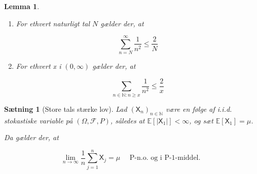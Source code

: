 \documentclass{article}
\newcommand{\1}{\mathbbm{1}}
\newtheorem{lemma}[theorem]{Lemma}
\newtheorem{proposition}[theorem]{Sætning}
\theoremstyle{boxed}
\begin{document}
\begin{theorem-box}
    \begin{lemma}
        \begin{enumerate}
            \item[\textnormal{(i)}] For ethvert naturligt tal $N$ gælder der, at

            $$
            \sum_{n=N}^{\infty} \frac{1}{n^2} \leq \frac{2}{N}
            $$
            
            \item[\textnormal{(ii)}] For ethvert x i $(0, \infty)$ gælder der, at
            
            $$
            \sum_{n \in \mathbb{N}: n \geq x} \frac{1}{n^2} \leq \frac{2}{x}
            $$
            
        \end{enumerate}
    \end{lemma}
\end{theorem-box}
\begin{theorem-box}
    \begin{proposition}[Store tals stærke lov]
        Lad $\left(\mathsf{X}_n\right)_{n \in \mathbb{N}}$ være en følge af i.i.d. stokastiske variable på $(\Omega, \mathcal{F}, P)$, således at $\mathbb{E}\left[\left|\mathsf{X}_1\right|\right]<\infty$, og sæt $\mathbb{E}\left[\mathsf{X}_1\right]=\mu$.

Da gælder der, at

$$
\lim _{n \rightarrow \infty} \frac{1}{n} \sum_{j=1}^n \mathsf{X}_j=\mu \quad \text { P-n.o. og i P-1-middel. }
$$

    \end{proposition}
\end{theorem-box}
\end{document}
